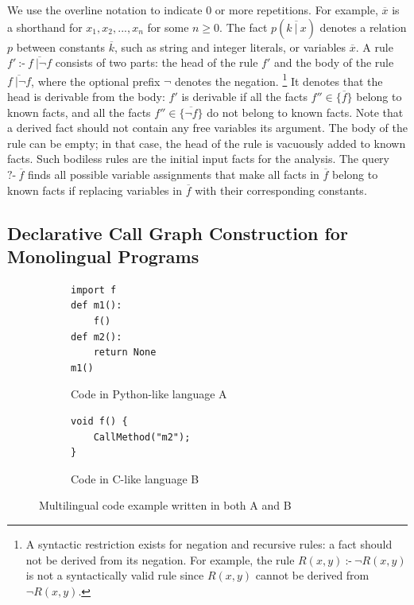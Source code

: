 \noindent
We use the overline notation to indicate 0 or more repetitions.  For example,
$\overline{x}$ is a shorthand for $x_1, x_2, ..., x_n$ for some $n \ge 0$.  The
fact $p(\overline{k\ |\ x})$ denotes a relation $p$ between constants
$\overline{k}$, such as string and integer literals, or variables
$\overline{x}$.  A rule $f'\ \mbox{:-}\ \overline{f\ |\neg f}$ consists of two
parts: the head of the rule $f'$ and the body of the rule $\overline{f\ |\neg
f}$, where the optional prefix $\neg$ denotes the negation.  \footnote{A
syntactic restriction exists for negation and recursive rules: a fact should
not be derived from its negation. For example, the rule $R(x, y)\ \mbox{:-}\
\neg R(x, y)$ is not a syntactically valid rule since $R(x, y)$ cannot be
derived from $\neg R(x, y)$.} It denotes that the head is derivable from the
body: $f'$ is derivable if all the facts $f'' \in \{\overline{f}\}$ belong to
known facts, and all the facts $f'' \in \{\overline{\neg f}\}$ do not belong to
known facts. Note that a derived fact should not contain
any free variables  its argument.
The body of the rule can be empty; in that case, the head of the
rule is vacuously added to known facts.  Such bodiless rules are the initial
input facts for the analysis.  The query $\mbox{?-}\ \overline{f}$ finds all
possible variable assignments that make all facts in $\overline{f}$ belong to
known facts if replacing variables in $\overline{f}$ with their corresponding
constants.


\subsection{Declarative Call Graph Construction for Monolingual Programs}\label{lab:ovmono}
\begin{figure}[t]
  \centering
  \begin{subfigure}[t]{0.45\textwidth}
    \begin{lstlisting}[style=mpython]
import f
def m1():
    f()
def m2():
    return None
m1()
    \end{lstlisting}
    \vspace*{-.5em}
    \caption{Code in Python-like language A}
    \label{fig:exam:langA}
  \end{subfigure}
  \begin{subfigure}[t]{0.45\textwidth}
    \begin{lstlisting}[style=mcpp,firstnumber=7]
void f() {
    CallMethod("m2");
}
    \end{lstlisting}
    \vspace*{3.5em}
    \caption{Code in C-like language B}
    \label{fig:exam:langB}
  \end{subfigure}
  \vspace*{-.5em}
  \caption{Multilingual code example written in both A and B}
  \label{fig:exam}
\end{figure}

